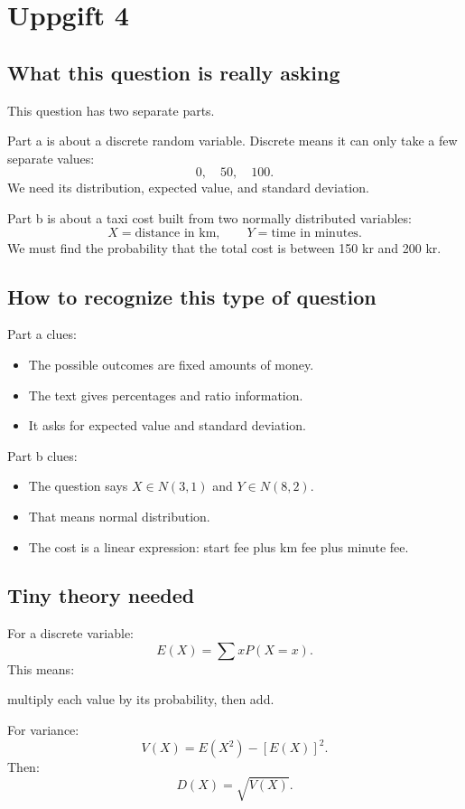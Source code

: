 \documentclass[11pt,a4paper]{article}
\begin{document}
\section*{Uppgift 4}

\subsection*{What this question is really asking}
This question has two separate parts.

Part a is about a discrete random variable. Discrete means it can only take a few separate values:
\[
0,\quad 50,\quad 100.
\]
We need its distribution, expected value, and standard deviation.

Part b is about a taxi cost built from two normally distributed variables:
\[
X=\text{distance in km},\qquad Y=\text{time in minutes}.
\]
We must find the probability that the total cost is between 150 kr and 200 kr.

\subsection*{How to recognize this type of question}
Part a clues:
\begin{itemize}[leftmargin=*]
    \item The possible outcomes are fixed amounts of money.
    \item The text gives percentages and ratio information.
    \item It asks for expected value and standard deviation.
\end{itemize}

Part b clues:
\begin{itemize}[leftmargin=*]
    \item The question says \(X\in N(3,1)\) and \(Y\in N(8,2)\).
    \item That means normal distribution.
    \item The cost is a linear expression: start fee plus km fee plus minute fee.
\end{itemize}

\subsection*{Tiny theory needed}
For a discrete variable:
\[
E(X)=\sum xP(X=x).
\]
This means:

multiply each value by its probability, then add.

For variance:
\[
V(X)=E(X^2)-[E(X)]^2.
\]
Then:
\[
D(X)=\sqrt{V(X)}.
\]
\end{document}
